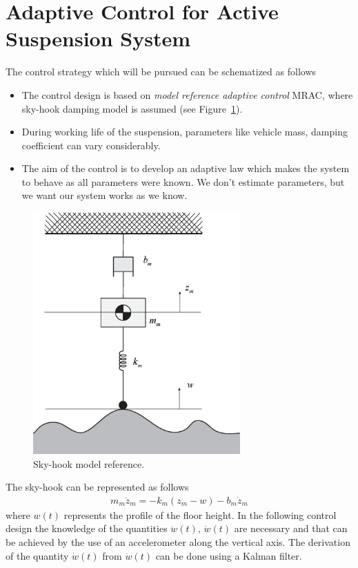 \documentclass[11pt,a4paper,oneside]{book}
\numberwithin{equation}{section}
\theoremstyle{it}
\theoremstyle{definition}
\begin{document}
\section{Adaptive Control for Active Suspension System} 
The control strategy which will be pursued can be schematized as follows
\begin{itemize}
	\item The control design is based on \textit{model reference adaptive control} MRAC, where sky-hook damping model is assumed (see Figure~\ref{figSky-hook}).
	\item During working life of the suspension, parameters like vehicle mass, damping coefficient can vary considerably.
	\item The aim of the control is to develop an adaptive law which makes the system to behave as all parameters were known. We don't estimate parameters, but we want our system works as we know.
\end{itemize}

\begin{figure}[H]
	\centering
	\includegraphics[width = 225pt, keepaspectratio]{figures/adaptive_control/sky_hook_model.eps}
	\captionsetup{width=0.75\textwidth}		
	\caption{Sky-hook model reference.}
	\label{figSky-hook}
\end{figure}
The sky-hook can be represented as follows
\begin{equation}
	\begin{aligned}
		m_m\ddot{z}_m = -k_m(z_m-w)-b_m\dot{z}_m
	\end{aligned}
\end{equation} 
where $w(t)$ represents the profile of the floor height. In the following control design the knowledge of the quantities $\ddot{w}(t),\,\dot{w}(t)$ are necessary and that can be achieved by the use of an accelerometer along the vertical axis. The derivation of the quantity $\dot{w}(t)$ from $\ddot{w}(t)$ can be done using a Kalman filter.
\end{document}

